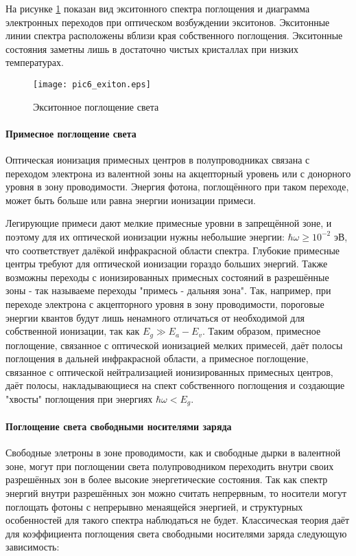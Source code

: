 На рисунке \ref{pic6_exiton} показан вид экситонного спектра поглощения и диаграмма электронных переходов при оптическом возбуждении экситонов. Экситонные линии спектра расположены вблизи края собственного поглощения. Экситонные состояния заметны лишь в достаточно чистых кристаллах при низких температурах.

\begin{figure}[h!]\centering
\texttt{[image: pic6\_exiton.eps]}
\caption{Экситонное поглощение света}
\label{pic6_exiton}
\end{figure}

\paragraph{Примесное поглощение света}
Оптическая ионизация примесных центров в полупроводниках связана с переходом электрона из валентной зоны на акцепторный уровень или с донорного уровня в зону проводимости. Энергия фотона, поглощённого при таком переходе, может быть больше или равна энергии ионизации примеси.

Легирующие примеси дают мелкие примесные уровни в запрещённой зоне, и поэтому для их оптической ионизации нужны небольшие энергии: $\hbar \omega \ge 10^{-2}$ эВ, что соответствует далёкой инфракрасной области спектра. Глубокие примесные центры требуют для оптической ионизации гораздо больших энергий. Также возможны переходы с ионизированных примесных состояний в разрешённые зоны - так называеме переходы "примесь - дальняя зона". Так, например, при переходе электрона с акцепторного уровня в зону проводимости, пороговые энергии квантов будут лишь ненамного отличаться от необходимой для собственной ионизации, так как $E_{g} \gg E_{a}-E_{v}$. Таким образом, примесное поглощение, связанное с оптической ионизацией мелких примесей, даёт полосы поглощения в дальней инфракрасной области, а примесное поглощение, связанное с оптической нейтрализацией ионизированных примесных центров, даёт полосы, накладывающиеся на спект собственного поглощения и создающие "хвосты" поглощения при энергиях $\hbar \omega < E_{g}$.

\paragraph{Поглощение света свободными носителями заряда}
Свободные элетроны в зоне проводимости, как и свободные дырки в валентной зоне, могут при поглощении света полупроводником переходить внутри своих разрешённых зон в более высокие энергетические состояния. Так как спектр энергий внутри разрешённых зон можно считать непрервным, то носители могут поглощать фотоны с непрерывно менаящейся энергией, и структурных особенностей для такого спектра наблюдаться не будет. Классическая теория даёт для коэффициента поглощения света свободными носителями заряда следующую зависимость:


